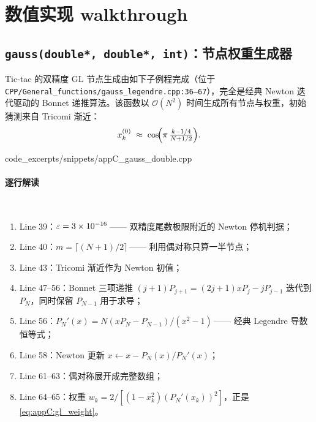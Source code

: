 \section{数值实现 walkthrough}
\label{sec:appC:code_walkthrough}

\subsection{\texttt{gauss(double*, double*, int)}：节点权重生成器}

Tic-tac 的双精度 GL 节点生成由如下子例程完成（位于
\texttt{CPP/General\_functions/gauss\_legendre.cpp:36--67}），完全是经典
Newton 迭代驱动的 Bonnet 递推算法。该函数以
$\mathcal{O}(N^{2})$ 时间生成所有节点与权重，初始猜测来自 Tricomi 渐近：
\begin{equation}
  x_k^{(0)} \;\approx\; \cos\!\Bigl(\pi\,\tfrac{k-1/4}{N+1/2}\Bigr).
\end{equation}


{code_excerpts/snippets/appC_gauss_double.cpp}

\paragraph{逐行解读}\

\begin{enumerate}
\item Line 39：$\varepsilon=3\times 10^{-16}$\,—— 双精度尾数极限附近的 Newton 停机判据；
\item Line 40：$m=\lceil(N+1)/2\rceil$\,—— 利用偶对称只算一半节点；
\item Line 43：Tricomi 渐近作为 Newton 初值；
\item Line 47--56：Bonnet 三项递推
      $(j+1)P_{j+1}=(2j+1)xP_j - jP_{j-1}$
      迭代到 $P_N$，同时保留 $P_{N-1}$ 用于求导；
\item Line 56：$P_N'(x)=N(xP_N-P_{N-1})/(x^{2}-1)$\,——
      经典 Legendre 导数恒等式；
\item Line 58：Newton 更新 $x\leftarrow x-P_N(x)/P_N'(x)$；
\item Line 61--63：偶对称展开成完整数组；
\item Line 64--65：权重 $w_k=2/[(1-x_k^{2})(P_N'(x_k))^{2}]$，正是 \eqref{eq:appC:gl_weight}。
\end{enumerate}


